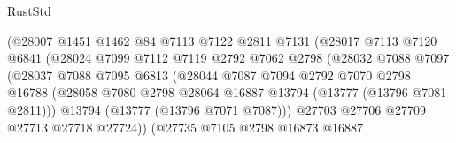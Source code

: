 \begin{lexlean}{RustStd}
\begin{coremodule}
                                  (@28007
                                    @1451
                                    @1462
                                    @84
                                    @7113
                                    @7122
                                    @2811
                                    @7131
                                    (@28017
                                      @7113
                                      @7120
                                      @6841
                                      (@28024
                                        @7099
                                        @7112
                                        @7119
                                        @2792
                                        @7062
                                        @2798
                                        (@28032
                                          @7088
                                          @7097
                                          (@28037
                                            @7088
                                            @7095
                                            @6813
                                            (@28044
                                              @7087
                                              @7094
                                              @2792
                                              @7070
                                              @2798
                                              @16788
                                              (@28058
                                                @7080
                                                @2798
                                                @28064
                                                @16887
                                                @13794
                                                (@13777 (@13796 @7081 @2811)))
                                              @13794
                                              (@13777 (@13796 @7071 @7087)))
                                            @27703
                                            @27706
                                            @27709
                                            @27713
                                            @27718
                                            @27724))
                                        (@27735
                                          @7105
                                          @2798
                                          @16873
                                          @16887

\end{coremodule}
\end{lexlean}
